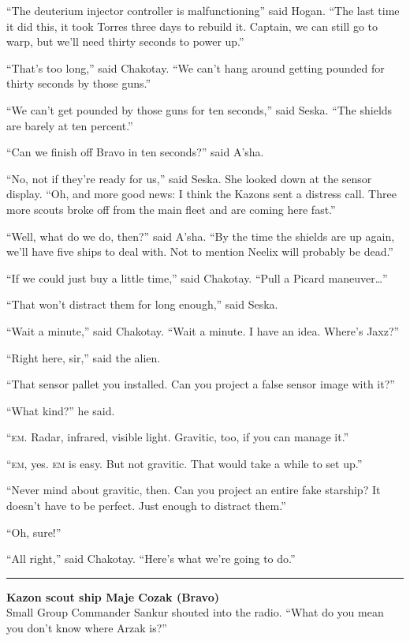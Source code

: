 \documentclass[twoside,letterpaper,12pt]{memoir}
\begin{document}
``The deuterium injector controller is malfunctioning'' said Hogan. ``The last time it did this, it took Torres three days to rebuild it. Captain, we can still go to warp, but we'll need thirty seconds to power up.''

``That's too long,'' said Chakotay. ``We can't hang around getting pounded for thirty seconds by those guns.''

``We can't get pounded by those guns for ten seconds,'' said Seska. ``The shields are barely at ten percent.''

``Can we finish off Bravo in ten seconds?'' said A'sha.

``No, not if they’re ready for us,'' said Seska. She looked down at the sensor display. ``Oh, and more good news: I think the Kazons sent a distress call. Three more scouts broke off from the main fleet and are coming here fast.''

``Well, what do we do, then?'' said A'sha. ``By the time the shields are up again, we'll have five ships to deal with. Not to mention Neelix will probably be dead.''

``If we could just buy a little time,'' said Chakotay. ``Pull a Picard maneuver\ldots ''

``That won't distract them for long enough,'' said Seska.

``Wait a minute,'' said Chakotay. ``Wait a minute. I have an idea. Where's Jaxz?''

``Right here, sir,'' said the alien.

``That sensor pallet you installed. Can you project a false sensor image with it?''

``What kind?'' he said.

``\textsc{em}. Radar, infrared, visible light. Gravitic, too, if you can manage it.''

``\textsc{em}, yes. \textsc{em} is easy. But not gravitic. That would take a while to set up.''

``Never mind about gravitic, then. Can you project an entire fake starship? It doesn't have to be perfect. Just enough to distract them.''

``Oh, sure!''

``All right,'' said Chakotay. ``Here's what we're going to do.''

\fancybreak{\rule{3cm}{0.4 pt}}
\noindent\textbf{Kazon scout ship Maje Cozak (Bravo)}\\

Small Group Commander Sankur shouted into the radio. ``What do you mean you don't know where Arzak is?''
\end{document}
